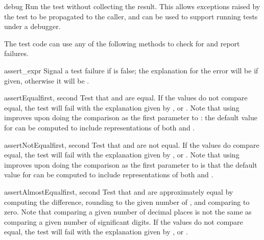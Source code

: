 \begin{methoddesc}[TestCase]{debug}{}
  Run the test without collecting the result.  This allows exceptions
  raised by the test to be propagated to the caller, and can be used
  to support running tests under a debugger.
\end{methoddesc}


The test code can use any of the following methods to check for and
report failures.

\begin{methoddesc}[TestCase]{assert_}{expr}
  Signal a test failure if  is false; the explanation for
  the error will be  if given, otherwise it will be
  .
\end{methoddesc}

\begin{methoddesc}[TestCase]{assertEqual}{first, second}
  Test that  and  are equal.  If the values do
  not compare equal, the test will fail with the explanation given by
  , or .  Note that using 
  improves upon doing the comparison as the first parameter to
  :  the default value for  can be
  computed to include representations of both  and
  .
\end{methoddesc}

\begin{methoddesc}[TestCase]{assertNotEqual}{first, second}
  Test that  and  are not equal.  If the values
  do compare equal, the test will fail with the explanation given by
  , or .  Note that using 
  improves upon doing the comparison as the first parameter to
   is that the default value for  can be
  computed to include representations of both  and
  .
\end{methoddesc}

\begin{methoddesc}[TestCase]{assertAlmostEqual}{first, second}
  Test that  and  are approximately equal
  by computing the difference, rounding to the given number of ,
  and comparing to zero.  Note that comparing a given number of decimal places
  is not the same as comparing a given number of significant digits.
  If the values do not compare equal, the test will fail with the explanation
  given by , or .  
\end{methoddesc}

